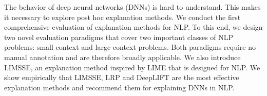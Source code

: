The behavior of deep neural networks (DNNs) is hard to understand. This makes it necessary to explore post hoc explanation methods. We conduct the first comprehensive evaluation of explanation methods for NLP. To this end, we design two novel evaluation paradigms that cover two important classes of NLP problems: small context and large context problems. Both paradigms require no manual annotation and are therefore broadly applicable. We also introduce LIMSSE, an explanation method inspired by LIME that is designed for NLP. We show empirically that LIMSSE, LRP and DeepLIFT are the most effective explanation methods and recommend them for explaining DNNs in NLP.
